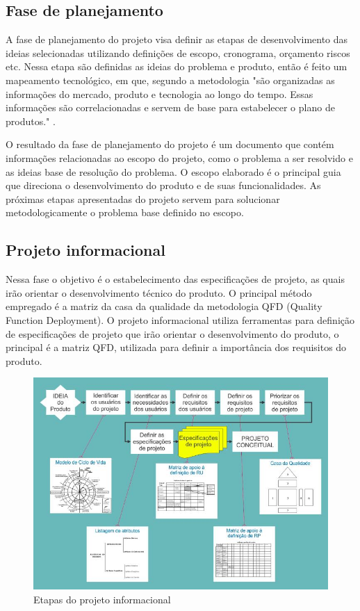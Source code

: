 \subsection{Fase de planejamento}

A fase de planejamento do projeto visa definir as etapas de desenvolvimento das ideias selecionadas utilizando definições de escopo, cronograma, orçamento riscos etc.
Nessa etapa são definidas as ideias do problema e produto, então é feito um mapeamento tecnológico, em que, segundo a metodologia "são organizadas as informações do mercado,
produto e tecnologia ao longo do tempo.  Essas informações são correlacionadas e servem de base para estabelecer o plano de produtos." \autocite{PRODIP}.

O resultado da fase de planejamento do projeto é um documento que contém informações relacionadas ao escopo do projeto, como o problema a ser resolvido e as ideias base de
resolução do problema. O escopo elaborado é o principal guia que direciona o desenvolvimento do produto e de suas funcionalidades. As próximas etapas apresentadas do projeto
servem para solucionar metodologicamente o problema base definido no escopo.

\subsection{Projeto informacional}

Nessa fase o objetivo é o estabelecimento das especificações de projeto, as quais irão orientar o desenvolvimento técnico do produto. O principal método empregado é a matriz
da casa da qualidade da metodologia QFD (Quality Function Deployment). O projeto informacional utiliza ferramentas para definição de especificações de projeto que irão
orientar o desenvolvimento do produto, o principal é a matriz QFD, utilizada para definir a importância dos requisitos do produto.  \autocite{PRODIP}

\begin{figure}[htb]
	\caption{\label{fig:1180}Etapas do projeto informacional}
	\begin{center}
		\includegraphics[width=\textwidth]{pictures/1180.jpg}
	\end{center}
\end{figure}

